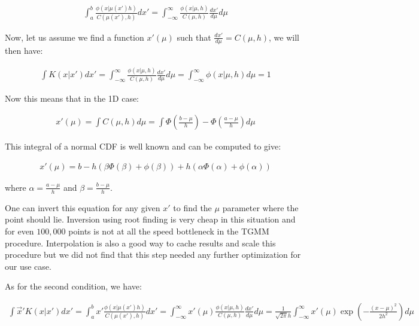 \documentclass[twocolumn,usenames,dvipsnames,linenumbers]{aastex631}
\begin{document}
\begin{equation}
\begin{aligned}
	\int_a^b \frac{\phi(x | \mu(x') h)}{C(\mu(x'), h)}dx' = \int_{-\infty}^{\infty} \frac{\phi(x | \mu, h)}{C(\mu, h)} \frac{dx'}{d\mu} d\mu
\end{aligned}
\end{equation}

Now, let us assume we find a function $x'(\mu)$ such that $\frac{dx'}{d\mu} = C(\mu, h)$, we will then have:

\begin{equation}
\begin{aligned}
	\int K(x | x')dx' = \int_{-\infty}^{\infty} \frac{\phi(x | \mu, h)}{C(\mu, h)} \frac{dx'}{d\mu} d\mu = \int_{-\infty}^{\infty} \phi(x | \mu, h) d\mu = 1
\end{aligned}
\end{equation}

Now this means that in the 1D case:

\begin{equation}
\begin{aligned}
	x'(\mu) = \int C(\mu, h) d\mu = \int \Phi(\frac{b-\mu}{h}) - \Phi(\frac{a-\mu}{h}) d\mu
\end{aligned}
\end{equation}

This integral of a normal CDF is well known and can be computed to give:

\begin{equation}
\begin{aligned}
	x'(\mu) = b - h \left( \beta \Phi(\beta) + \phi(\beta) \right) + h \left( \alpha \Phi(\alpha) + \phi(\alpha) \right)
\end{aligned}
\end{equation}

where $\alpha = \frac{a-\mu}{h}$ and $\beta = \frac{b-\mu}{h}$.

One can invert this equation for any given $x'$ to find the $\mu$ parameter where the point should lie. Inversion using root finding is very cheap in this situation and for even $100,000$ points is not at all the speed bottleneck in the TGMM procedure. Interpolation is also a good way to cache results and scale this procedure but we did not find that this step needed any further optimization for our use case. 

As for the second condition, we have:

\begin{equation}
\begin{aligned}
	\int \vec{x}'K(x | x')dx' = \int_a^b x'\frac{\phi(x | \mu(x') h)}{C(\mu(x'), h)}dx' = \int_{-\infty}^{\infty} x'(\mu)\frac{\phi(x | \mu, h)}{C(\mu, h)} \frac{dx'}{d\mu} d\mu = \frac{1}{\sqrt{2\pi}h}\int_{-\infty}^{\infty} x'(\mu)\exp(-\frac{(x-\mu)^2}{2h^2})d\mu
\end{aligned}
\end{equation}
\end{document}
